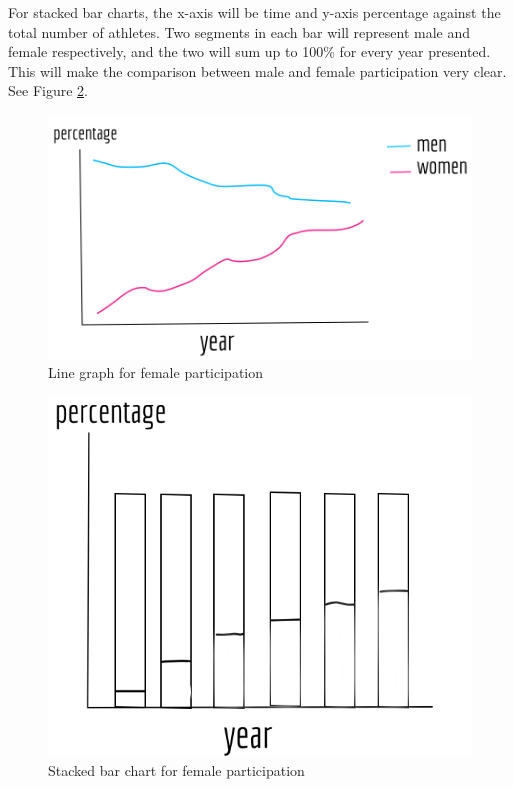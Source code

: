 \documentclass[
]{article}
\begin{document}
For stacked bar charts, the x-axis will be time and y-axis percentage against the total number of athletes. Two segments in each bar will represent male and female respectively, and the two will sum up to 100\% for every year presented. This will make the comparison between male and female participation very clear. See Figure \ref{fig:figure13}.

\begin{figure}

{\centering \includegraphics[width=0.85\linewidth]{static/pics/1} 

}

\caption{Line graph for female participation}\label{fig:figure12}
\end{figure}

\begin{figure}

{\centering \includegraphics[width=0.75\linewidth]{static/pics/2} 

}

\caption{Stacked bar chart for female participation}\label{fig:figure13}
\end{figure}
\end{document}
